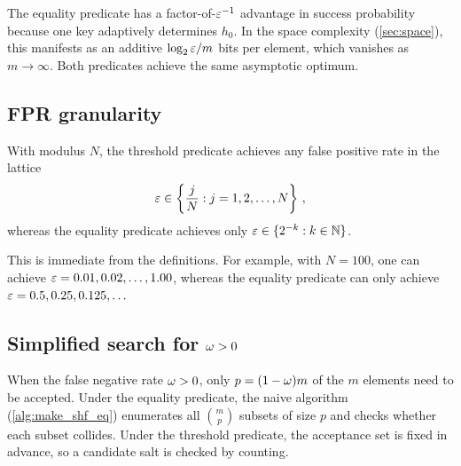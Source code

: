 \begin{remark}
The equality predicate has a factor-of-$\varepsilon^{-1}$ advantage in success
probability because one key adaptively determines $h_0$.
In the space complexity (\cref{sec:space}), this manifests as an additive
$\log_2 \varepsilon / m$ bits per element, which vanishes as $m \to \infty$.
Both predicates achieve the same asymptotic optimum.
\end{remark}

\subsection{FPR granularity}

\begin{theorem}
\label{thm:fpr_granularity}
With modulus $N$, the threshold predicate achieves any false positive rate in
the lattice
\begin{equation}
    \varepsilon \in \left\{\frac{j}{N} : j = 1, 2, \ldots, N\right\}\,,
\end{equation}
whereas the equality predicate achieves only
$\varepsilon \in \{2^{-k} : k \in \mathbb{N}\}$.
\end{theorem}

This is immediate from the definitions.
For example, with $N = 100$, one can achieve $\varepsilon = 0.01, 0.02, \ldots, 1.00$, whereas the equality predicate can only achieve $\varepsilon = 0.5, 0.25, 0.125, \ldots$

\subsection{Simplified search for $\omega > 0$}

When the false negative rate $\omega > 0$, only $p = (1-\omega)m$ of the
$m$ elements need to be accepted.
Under the equality predicate, the naive algorithm (\cref{alg:make_shf_eq})
enumerates all $\binom{m}{p}$ subsets of size $p$ and checks whether each
subset collides.
Under the threshold predicate, the acceptance set is fixed in advance, so a
candidate salt is checked by counting.

